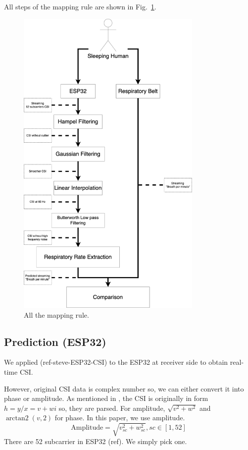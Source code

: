 \documentclass[10pt,letterpaper]{article}
\DeclareMathOperator{\arctantwo}{arctan2}
\begin{document}
	All steps of the mapping rule are shown in Fig.~\ref{fig:MAPINGSTEP}. 
	

	\begin{figure}[htbp]
		\centerline{\includegraphics[width=90mm,scale=0.2]{STEP12.png}}
		\caption{All the mapping rule.}
		\label{fig:MAPINGSTEP}
	\end{figure}
	
	\subsection*{Prediction (ESP32)}
	
	We applied (ref-steve-ESP32-CSI) to the ESP32 at receiver side to obtain real-time CSI. 
	
	However, original CSI data is complex number so, we can either convert it into phase or amplitude. As mentioned in , the CSI is originally in form $h=y/x=v+wi$ so, they are parsed. For amplitude,  $\sqrt{ v^2+w^2 }$ and $\arctantwo(v, 2 )$ for phase.
	In this paper, we use amplitude.
	\begin{equation}
	\text{Amplitude} =  {  \sqrt{ v_{sc}^2+w_{sc}^2 } , sc \in [1, 52]}
	\label{eq:CSIampParser}
\end{equation}	
	There are 52 subcarrier in ESP32 (ref). We simply pick one.
	
\end{document}
